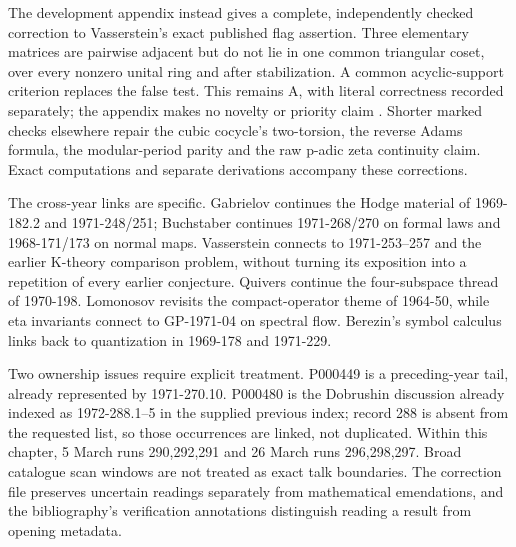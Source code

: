 The development appendix instead gives a complete, independently checked correction to Vasserstein's exact published flag assertion. Three elementary matrices are pairwise adjacent but do not lie in one common triangular coset, over every nonzero unital ring and after stabilization. A common acyclic-support criterion replaces the false test. This remains A, with literal correctness recorded separately; the appendix makes no novelty or priority claim \citep[\S11, Remark~(c)]{vaserstein1976foundations}. Shorter marked checks elsewhere repair the cubic cocycle's two-torsion, the reverse Adams formula, the modular-period parity and the raw p-adic zeta continuity claim. Exact computations and separate derivations accompany these corrections.

The cross-year links are specific. Gabrielov continues the Hodge material of 1969-182.2 and 1971-248/251; Buchstaber continues 1971-268/270 on formal laws and 1968-171/173 on normal maps. Vasserstein connects to 1971-253--257 and the earlier K-theory comparison problem, without turning its exposition into a repetition of every earlier conjecture. Quivers continue the four-subspace thread of 1970-198. Lomonosov revisits the compact-operator theme of 1964-50, while eta invariants connect to GP-1971-04 on spectral flow. Berezin's symbol calculus links back to quantization in 1969-178 and 1971-229.

Two ownership issues require explicit treatment. P000449 is a preceding-year tail, already represented by 1971-270.10. P000480 is the Dobrushin discussion already indexed as 1972-288.1--5 in the supplied previous index; record 288 is absent from the requested list, so those occurrences are linked, not duplicated. Within this chapter, 5 March runs 290,292,291 and 26 March runs 296,298,297. Broad catalogue scan windows are not treated as exact talk boundaries. The correction file preserves uncertain readings separately from mathematical emendations, and the bibliography's verification annotations distinguish reading a result from opening metadata.
